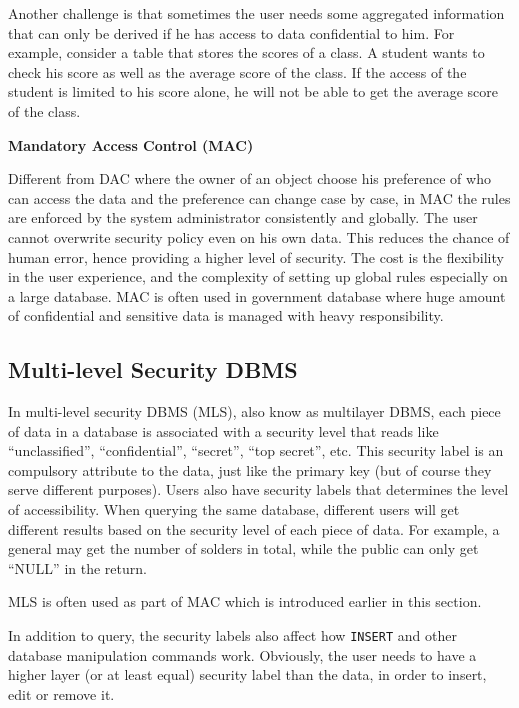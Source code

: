 Another challenge is that sometimes the user needs some aggregated information that can only be derived if he has access to data confidential to him. For example, consider a table that stores the scores of a class. A student wants to check his score as well as the average score of the class. If the access of the student is limited to his score alone, he will not be able to get the average score of the class.

\vspace{0.1in}
\noindent \textbf{Mandatory Access Control (MAC)}
\vspace{0.1in}

Different from DAC where the owner of an object choose his preference of who can access the data and the preference can change case by case, in MAC the rules are enforced by the system administrator consistently and globally. The user cannot overwrite security policy even on his own data. This reduces the chance of human error, hence providing a higher level of security. The cost is the flexibility in the user experience, and the complexity of setting up global rules especially on a large database. MAC is often used in government database where huge amount of confidential and sensitive data is managed with heavy responsibility.

\subsection{Multi-level Security DBMS}

In multi-level security DBMS (MLS), also know as multilayer DBMS, each piece of data in a database is associated with a security level that reads like ``unclassified'', ``confidential'', ``secret'', ``top secret'', etc. This security label is an compulsory attribute to the data, just like the primary key (but of course they serve different purposes). Users also have security labels that determines the level of accessibility. When querying the same database, different users will get different results based on the security level of each piece of data. For example, a general may get the number of solders in total, while the public can only get ``NULL'' in the return.

MLS is often used as part of MAC which is introduced earlier in this section.

In addition to query, the security labels also affect how \verb|INSERT| and other database manipulation commands work. Obviously, the user needs to have a higher layer (or at least equal) security label than the data, in order to insert, edit or remove it. 

